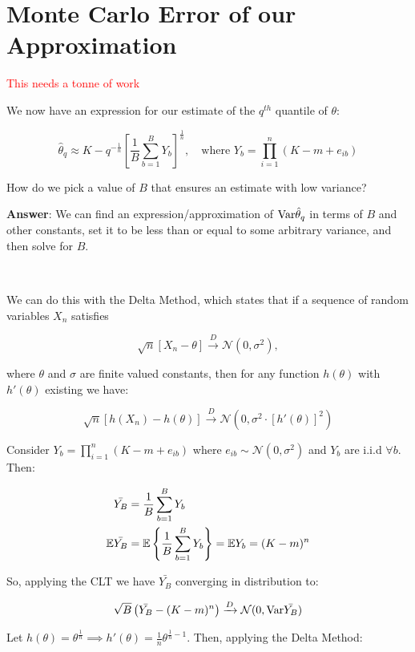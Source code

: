 \newpage

\section{Monte Carlo Error of our Approximation}

\textcolor{red}{This needs a tonne of work}

We now have an expression for our estimate of the $q^{th}$ quantile of $\theta$:

\[
    \hat{\theta}_q \approx K - q^{-\frac{1}{n}} \left[\frac{1}{B}\sum_{b=1}^B Y_b \right]^\frac{1}{n}, \quad \text{where $Y_b = \prod_{i=1}^n \left( K - m + e_{ib} \right)$}
\]

How do we pick a value of $B$ that ensures an estimate with low variance?

\textbf{Answer}: We can find an expression/approximation of $\mathrm{Var}\hat{\theta}_q$ in terms of $B$ and other constants, set it to be less than or equal to some arbitrary variance, and then solve for $B$.

\

We can do this with the Delta Method, which states that if a sequence of random variables $X_n$ satisfies

\[
\sqrt{n} [X_n - \theta] \xrightarrow{D} \mathcal{N}(0, \sigma^2),
\]

where $\theta$ and $\sigma$ are finite valued constants, then for any function $h(\theta)$ with $h'(\theta)$ existing we have: 

\[
\sqrt{n} [h(X_n) - h(\theta)] \xrightarrow{D} \mathcal{N}(0, \sigma^2 \cdot [h'(\theta)]^2 )
\]

Consider $Y_b = \prod_{i=1}^n (K - m + e_{ib})$ where $e_{ib} \sim \mathcal{N}(0, \sigma^2)$ and $Y_b$ are i.i.d $\forall b$. Then:

\begin{align*}
    \bar{Y_B} &= \frac{1}{B} \sum_{b=1}^B Y_b \\
    \mathbb{E}{\bar{Y_B}} &= \mathbb{E} \left\{\frac{1}{B} \sum_{b=1}^B Y_b \right\} = \mathbb{E} Y_b = (K - m)^n
\end{align*}

So, applying the CLT we have $\bar{Y_B}$ converging in distribution to:

\[
\sqrt{B} \left( \bar{Y_B} - (K - m)^n \right)  \xrightarrow{D} \mathcal{N}(0, \mathrm{Var}{\bar{Y_B}})
\]

Let $h(\theta) = \theta^\frac{1}{n} \implies h'(\theta) = \frac{1}{n}\theta^{\frac{1}{n} - 1}$. Then, applying the Delta Method:

